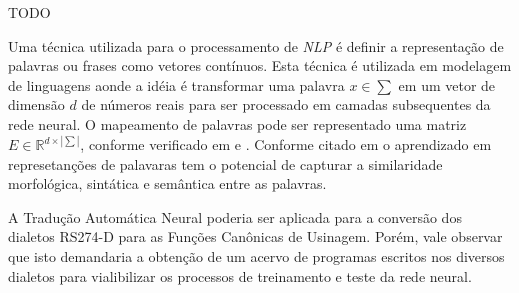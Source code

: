 \documentclass[a4paper]{article}
\begin{document}
    TODO
    
    Uma t\'ecnica utilizada para o processamento de \emph{NLP} \'e definir a representa\c c\~ao 
    de palavras ou frases como vetores cont\'inuos. Esta t\'ecnica \'e utilizada em modelagem de 
    linguagens aonde a id\'eia \'e transformar uma palavra $x \in \sum$ em um vetor de dimens\~ao 
    $d$ de n\'umeros reais para ser processado em camadas subsequentes da rede neural.
    O mapeamento de palavras pode ser representado uma matriz $E \in \mathbb{R} ^{d \times |\sum|}$,
    conforme verificado em \cite{collobert:2008} e \cite{stahlberg:2020}.
    Conforme citado em \cite{stahlberg:2020} o aprendizado em represetan\c c\~oes de palavaras
    tem o potencial de capturar a similaridade morfol\'ogica, sint\'atica e sem\^antica entre as 
    palavras.
    
    A Tradução Automática Neural poderia ser aplicada para a conversão dos dialetos RS274-D 
    para as Funções Canônicas de Usinagem. Porém, vale observar que isto demandaria a obtenção de 
    um acervo de programas escritos nos diversos dialetos para vialibilizar os processos de 
    treinamento e teste da rede neural.


 
\end{document}
